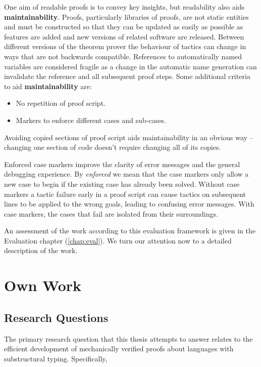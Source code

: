 \documentclass[]{unswthesis}
\let\i\textit
\let\b\textbf
\begin{document}
One aim of readable proofs is to convey key insights, but readability also aids \b{maintainability}. Proofs, particularly libraries of proofs, are not static entities and must be constructed so that they can be updated as easily as possible as features are added and new versions of related software are released. Between different versions of the theorem prover the behaviour of tactics can change in ways that are not backwards compatible. References to automatically named variables are considered fragile as a change in the automatic name generation can invalidate the reference and all subsequent proof steps. Some additional criteria to aid \b{maintainability} are:

\begin{itemize}
\item No repetition of proof script.
\item Markers to enforce different cases and sub-cases.
\end{itemize}

Avoiding copied sections of proof script aids maintainability in an obvious way -- changing one section of code doesn't require changing all of its copies.

Enforced case markers improve the clarity of error messages and the general debugging experience. By \i{enforced} we mean that the case markers only allow a new case to begin if the existing case has already been solved. Without case markers a tactic failure early in a proof script can cause tactics on subsequent lines to be applied to the wrong goals, leading to confusing error messages. With case markers, the cases that fail are isolated from their surroundings.

An assessment of the work according to this evaluation framework is given in the Evaluation chapter (\cref{chap:eval}). We turn our attention now to a detailed description of the work.

\chapter{Own Work}

\section{Research Questions}

The primary research question that this thesis attempts to answer relates to the efficient development of mechanically verified proofs about languages with substructural typing. Specifically,
\end{document}
